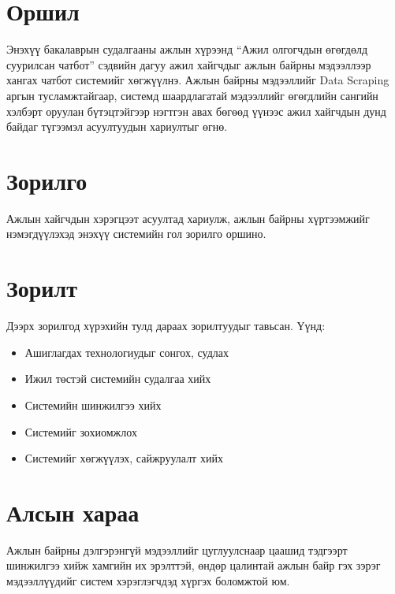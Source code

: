 \section{Оршил}
Энэхүү бакалаврын судалгааны ажлын хүрээнд ``Ажил олгогчдын өгөгдөлд суурилсан чатбот'' сэдвийн дагуу ажил хайгчдыг ажлын байрны мэдээллээр хангах чатбот системийг хөгжүүлнэ. Ажлын байрны мэдээллийг Data Scraping аргын тусламжтайгаар, системд шаардлагатай мэдээллийг өгөгдлийн сангийн хэлбэрт оруулан бүтэцтэйгээр нэгтгэн авах бөгөөд үүнээс ажил хайгчдын дунд байдаг түгээмэл асуултуудын хариултыг өгнө.
\section{Зорилго}
\quad Ажлын хайгчдын хэрэгцээт асуултад хариулж, ажлын байрны хүртээмжийг нэмэгдүүлэхэд энэхүү системийн гол зорилго оршино.
\section{Зорилт}
\quad Дээрх зорилгод хүрэхийн тулд дараах зорилтуудыг тавьсан. Үүнд:
\begin{itemize}
	\item Ашиглагдах технологиудыг сонгох, судлах
	\item Ижил төстэй системийн судалгаа хийх
	\item Системийн шинжилгээ хийх
	\item Системийг зохиомжлох
	\item Системийг хөгжүүлэх, сайжруулалт хийх
\end{itemize}
\section{Алсын хараа}
\quad Ажлын байрны дэлгэрэнгүй мэдээллийг цуглуулснаар цаашид тэдгээрт шинжилгээ хийж хамгийн их эрэлттэй, өндөр цалинтай ажлын байр гэх зэрэг мэдээллүүдийг систем хэрэглэгчдэд хүргэх боломжтой юм. 